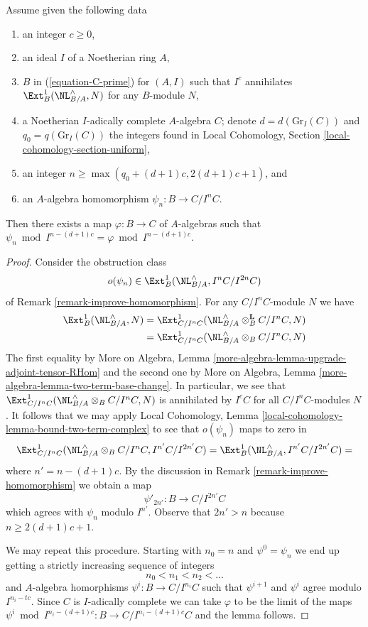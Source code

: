 \begin{lemma}
\label{lemma-get-morphism-general-better}
Assume given the following data
\begin{enumerate}
\item an integer $c \geq 0$,
\item an ideal $I$ of a Noetherian ring $A$,
\item $B$ in (\ref{equation-C-prime}) for $(A, I)$ such that
$I^c$ annihilates $\Ext^1_B(\NL_{B/A}^\wedge, N)$
for any $B$-module $N$,
\item a Noetherian $I$-adically complete $A$-algebra $C$; denote
$d = d(\text{Gr}_I(C))$ and $q_0 = q(\text{Gr}_I(C))$ the integers found in
Local Cohomology, Section \ref{local-cohomology-section-uniform},
\item an integer $n \geq \max(q_0 + (d + 1)c, 2(d + 1)c + 1)$, and
\item an $A$-algebra homomorphism $\psi_n : B \to C/I^nC$.
\end{enumerate}
Then there exists a map $\varphi : B \to C$ of $A$-algebras such
that $\psi_n \bmod I^{n - (d + 1)c} = \varphi \bmod I^{n - (d + 1)c}$.
\end{lemma}

\begin{proof}
Consider the obstruction class
$$
o(\psi_n) \in \Ext^1_B(\NL_{B/A}^\wedge, I^nC/I^{2n}C)
$$
of Remark \ref{remark-improve-homomorphism}. For any $C/I^nC$-module
$N$ we have
\begin{align*}
\Ext^1_B(\NL_{B/A}^\wedge, N)
& =
\Ext^1_{C/I^nC}(\NL_{B/A}^\wedge \otimes_B^\mathbf{L} C/I^nC, N) \\
& =
\Ext^1_{C/I^nC}(\NL_{B/A}^\wedge \otimes_B C/I^nC, N)
\end{align*}
The first equality by
More on Algebra, Lemma \ref{more-algebra-lemma-upgrade-adjoint-tensor-RHom}
and the second one by
More on Algebra, Lemma \ref{more-algebra-lemma-two-term-base-change}.
In particular, we see that
$\Ext^1_{C/I^nC}(\NL_{B/A}^\wedge \otimes_B C/I^nC, N)$ is annihilated by
$I^cC$ for all $C/I^nC$-modules $N$.
It follows that we may apply
Local Cohomology, Lemma \ref{local-cohomology-lemma-bound-two-term-complex}
to see that $o(\psi_n)$ maps to zero in
$$
\Ext^1_{C/I^nC}(\NL_{B/A}^\wedge \otimes_B C/I^nC, I^{n'}C/I^{2n'}C) =
\Ext^1_B(\NL_{B/A}^\wedge, I^{n'}C/I^{2n'}C) =
$$
where $n' = n - (d + 1)c$. By the discussion in
Remark \ref{remark-improve-homomorphism} we obtain a map
$$
\psi'_{2n'} : B \to C/I^{2n'}C
$$
which agrees with $\psi_n$ modulo $I^{n'}$.
Observe that $2n' > n$ because $n \geq 2(d + 1)c + 1$.

\medskip\noindent
We may repeat this procedure. Starting with $n_0 = n$ and
$\psi^0 = \psi_n$ we end up getting a strictly increasing
sequence of integers
$$
n_0 < n_1 < n_2 < \ldots
$$
and $A$-algebra homorphisms $\psi^i : B \to C/I^{n_i}C$
such that $\psi^{i + 1}$ and $\psi^i$ agree modulo $I^{n_i - tc}$.
Since $C$ is $I$-adically complete we can take $\varphi$
to be the limit of the maps
$\psi^i \bmod I^{n_i - (d + 1)c} : B \to C/I^{n_i - (d + 1)c}C$
and the lemma follows.
\end{proof}

